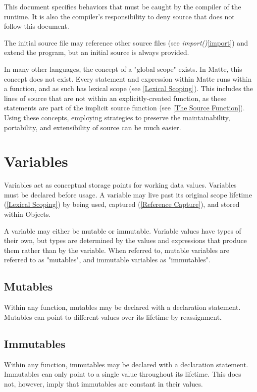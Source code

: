 \documentclass[12pt,letterpaper]{report}
\begin{document}
This document specifies behaviors that must be caught by the compiler of the 
runtime. It is also the compiler's responsibility to deny source that does not 
follow this document.

The initial source file may reference other source files (see \textit{import()}\autoref{import}) 
and extend the program, but an initial source is always provided.

In many other languages, the concept of a "global scope" exists. In Matte, 
this concept does not exist. Every statement and expression within Matte 
runs within a function, and as such has lexical scope (see \autoref{Lexical Scoping}).
This includes the lines of source that are not within an explicitly-created
function, as these statements are part of the implicit source function 
(see \autoref{The Source Function}). Using these concepts, employing strategies 
to preserve the maintainability, portability, and extensibility of source can 
be much easier.





\chapter{Variables}\label{Variables}

Variables act as conceptual storage points for working data values. Variables must be declared before usage.
A variable may live past its original scope lifetime (\autoref{Lexical Scoping}) by being used, captured (\autoref{Reference Capture}), and stored within Objects.

A variable may either be mutable or immutable. Variable values have types of their own, but 
types are determined by the values and expressions that produce them rather than by the 
variable. When referred to, mutable variables are referred to as "mutables", and immutable variables as "immutables".

\section{Mutables}\label{Mutables}

Within any function, mutables may be declared with a declaration statement.
Mutables can point to different values over its lifetime by reassignment.
    




\section{Immutables}\label{Immutables}
Within any function, immutables may be declared with a declaration statement.
Immutables can only point to a single value throughout its lifetime. This does not, however,
imply that immutables are constant in their values. 
\end{document}
